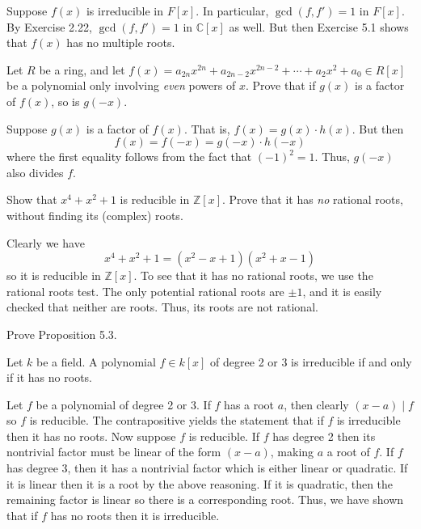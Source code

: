 \documentclass[../../master.tex]{subfiles}
\begin{document}
\begin{solution}
    Suppose $f(x)$ is irreducible in $F[x]$.
    In particular, $\gcd(f, f') = 1$ in $F[x]$.
    By Exercise 2.22, $\gcd(f, f') = 1$ in $\mathbb{C}[x]$ as well.
    But then Exercise 5.1 shows that $f(x)$ has no multiple roots.
\end{solution}

\begin{problem}
    Let $R$ be a ring, and let $f(x) = a_{2n}x^{2n} + a_{2n-2}x^{2n-2} + \cdots + a_2 x^2 + a_0 \in R[x]$ be a polynomial only involving \textit{even} powers of $x$. 
    Prove that if $g(x)$ is a factor of $f(x)$, so is $g(-x)$.
\end{problem}

\begin{solution}
    Suppose $g(x)$ is a factor of $f(x)$.
    That is, $f(x) = g(x) \cdot h(x)$.
    But then
    \[
        f(x) = f(-x) = g(-x) \cdot h(-x)
    \]
    where the first equality follows from the fact that $(-1)^2 = 1$.
    Thus, $g(-x)$ also divides $f$.
\end{solution}

\begin{problem}
    Show that $x^{4} + x^2 + 1$ is reducible in $\mathbb{Z}[x]$.
    Prove that it has \textit{no} rational roots, without finding its (complex) roots.
\end{problem}

\begin{solution}
    Clearly we have
    \[
        x^{4} + x^2 + 1 = (x^2 - x + 1) (x^2 + x - 1)
    \]
    so it is reducible in $\mathbb{Z}[x]$.
    To see that it has no rational roots, we use the rational roots test.
    The only potential rational roots are $\pm 1$, and it is easily checked that neither are roots.
    Thus, its roots are not rational.
\end{solution}

\begin{problem}
    Prove Proposition 5.3.
    \begin{proposition}[Proposition 5.3] 
        Let $k$ be a field. A polynomial $f \in k[x]$ of degree 2 or 3 is irreducible if and only if it has no roots.
    \end{proposition}
\end{problem}

\begin{solution}
    Let $f$ be a polynomial of degree 2 or 3.
    If $f$ has a root $a$, then clearly $(x - a) \mid f$ so $f$ is reducible.
    The contrapositive yields the statement that if $f$ is irreducible then it has no roots.
    Now suppose $f$ is reducible. 
    If $f$ has degree 2 then its nontrivial factor must be linear of the form $(x - a)$, making $a$ a root of $f$.
    If $f$ has degree 3, then it has a nontrivial factor which is either linear or quadratic. 
    If it is linear then it is a root by the above reasoning.
    If it is quadratic, then the remaining factor is linear so there is a corresponding root.
    Thus, we have shown that if $f$ has no roots then it is irreducible.
\end{solution}
\end{document}
